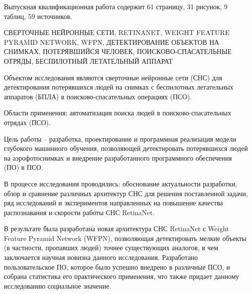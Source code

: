 \documentclass[a4paper,14pt]{extarticle} %
\begin{document}
Выпускная квалификационная работа содержит 61 страницу, 31 рисунок, 9 таблиц, 59 источников.

\MakeUppercase{сверточные нейронные сети, RetinaNet, Weight Feature Pyramid Network, WFPN, детектирование объектов на снимках, потерявшийся человек, поисково-спасательные отряды, беспилотный летательный аппарат}

Объектом исследования являются сверточные нейронные сети (СНС) для детектирования потерявшихся людей на снимках с беспилотных летательных аппаратов (БПЛА) в поисково-спасательных операциях (ПСО).

Области применения: автоматизация поиска людей в поисково-спасательных отрядах (ПСО).

Цель работы -- разработка, проектирование и программная реализация модели глубокого машинного обучения, позволяющей детектировать потерявшихся людей на аэрофотоснимках и внедрение разработанного программного обеспечения (ПО) в ПСО.

В процессе исследования проводились: обоснование актуальности разработки, обзор и сравнение различных архитектур СНС для решения поставленной задачи, ряд исследований и экспериментов направленных на повышение качества распознавания и скорости работы СНС RetinaNet.

В результате была разработана новая архитектура СНС RetinaNet с Weight Feature Pyramid Network (WFPN), позволяющая детектировать мелкие объекты (в частности, пропавших людей) точнее существующих аналогов, в чем заключается научная новизна данного исследования. Разработано пользовательское ПО, которое было успешно внедрено в различные ПСО, и собрана статистика его практического применения, что также придает данному исследованию социальное значение.
\end{document}
